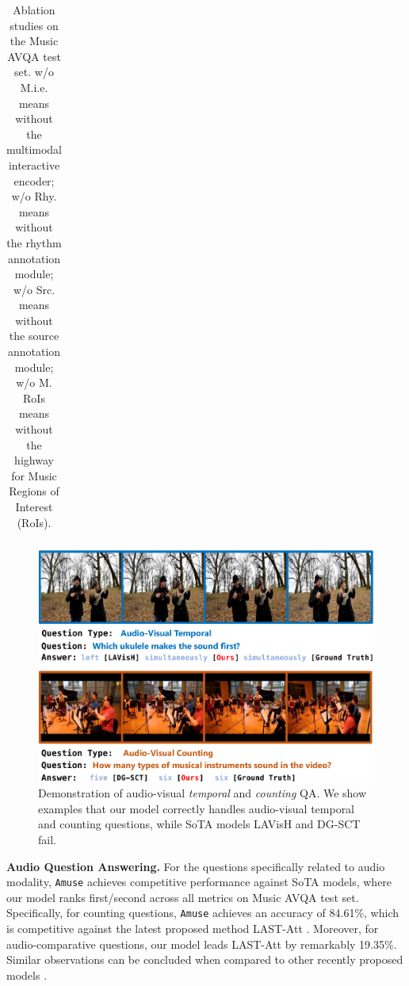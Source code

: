 \documentclass[11pt]{article}
\begin{document}
\begin{table}[t]
{\begin{tabular}{@{}l|ccc|ccc|cccccc|c@{}}
\end{tabular}
}
\caption{Ablation studies on the Music AVQA \cite{li2022learning} test set. w/o M.i.e. means without the multimodal interactive encoder; w/o Rhy. means without the rhythm annotation module; w/o Src. means without the source annotation module; w/o M. RoIs means without the highway for Music Regions of Interest (RoIs).
}
\vspace{-0.4cm}
\label{tab:tab3}
\end{table}

\begin{figure}[htp]
\begin{center}
\includegraphics[width=1.0\linewidth]{figs/temp_count_comparison_with_sota.pdf}
\end{center}
\vspace{-0.3cm}
\caption{Demonstration of audio-visual \textit{temporal} and \textit{counting} QA. We show examples that our model correctly handles audio-visual temporal and counting questions, while SoTA models LAVisH and DG-SCT fail.}
\label{fig:twoquestion}
\vspace{-0.2cm}
\end{figure}

\textbf{Audio Question Answering.} For the questions specifically related to audio modality, \texttt{Amuse} achieves competitive performance against SoTA models, where our model ranks first/second across all metrics on Music AVQA test set.  Specifically, for counting questions, \texttt{Amuse} achieves an accuracy of 84.61\%, which is competitive against the latest proposed method LAST-Att \cite{liu2024tackling}. Moreover, for audio-comparative questions, our model leads LAST-Att by remarkably 19.35\%. Similar observations can be concluded when compared to other recently proposed models \cite{liu2023parameter, lin2023vision, duan2024cross}. 
\end{document}
